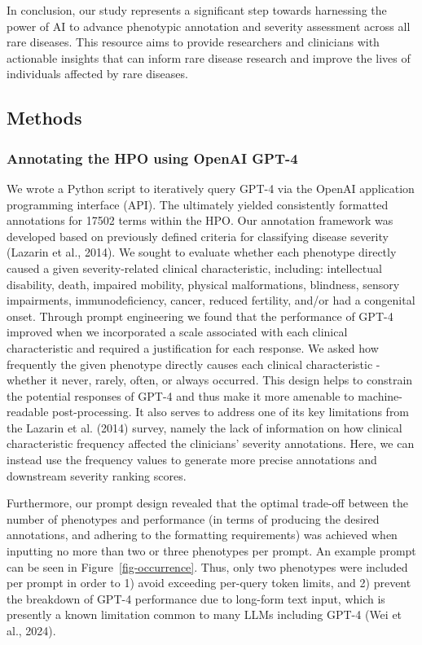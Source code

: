 \documentclass[
]{agujournal2019}
\begin{document}
In conclusion, our study represents a significant step towards
harnessing the power of AI to advance phenotypic annotation and severity
assessment across all rare diseases. This resource aims to provide
researchers and clinicians with actionable insights that can inform rare
disease research and improve the lives of individuals affected by rare
diseases.

\subsection{Methods}\label{methods}

\subsubsection{Annotating the HPO using OpenAI
GPT-4}\label{annotating-the-hpo-using-openai-gpt-4}

We wrote a Python script to iteratively query GPT-4 via the OpenAI
application programming interface (API). The ultimately yielded
consistently formatted annotations for 17502 terms within the HPO. Our
annotation framework was developed based on previously defined criteria
for classifying disease severity (Lazarin et al., 2014). We sought to
evaluate whether each phenotype directly caused a given severity-related
clinical characteristic, including: intellectual disability, death,
impaired mobility, physical malformations, blindness, sensory
impairments, immunodeficiency, cancer, reduced fertility, and/or had a
congenital onset. Through prompt engineering we found that the
performance of GPT-4 improved when we incorporated a scale associated
with each clinical characteristic and required a justification for each
response. We asked how frequently the given phenotype directly causes
each clinical characteristic - whether it never, rarely, often, or
always occurred. This design helps to constrain the potential responses
of GPT-4 and thus make it more amenable to machine-readable
post-processing. It also serves to address one of its key limitations
from the Lazarin et al. (2014) survey, namely the lack of information on
how clinical characteristic frequency affected the clinicians' severity
annotations. Here, we can instead use the frequency values to generate
more precise annotations and downstream severity ranking scores.

Furthermore, our prompt design revealed that the optimal trade-off
between the number of phenotypes and performance (in terms of producing
the desired annotations, and adhering to the formatting requirements)
was achieved when inputting no more than two or three phenotypes per
prompt. An example prompt can be seen in Figure~\ref{fig-occurrence}.
Thus, only two phenotypes were included per prompt in order to 1) avoid
exceeding per-query token limits, and 2) prevent the breakdown of GPT-4
performance due to long-form text input, which is presently a known
limitation common to many LLMs including GPT-4 (Wei et al., 2024).
\end{document}

